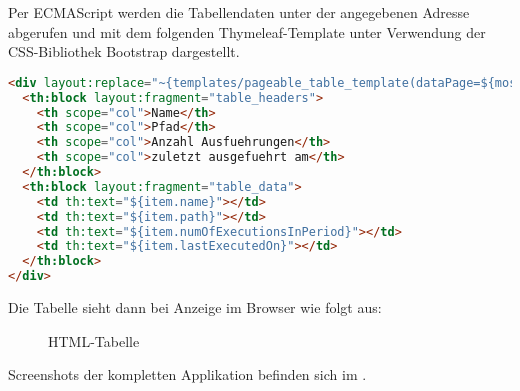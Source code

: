 Per ECMAScript werden die Tabellendaten unter der angegebenen Adresse abgerufen und \ua mit dem folgenden Thymeleaf-Template unter Verwendung der CSS-Bibliothek Bootstrap dargestellt.
\begin{lstlisting}[language=HTML,caption={Tabellen-Fragment}]
<div layout:replace="~{templates/pageable_table_template(dataPage=${mostUsedReports})}">
  <th:block layout:fragment="table_headers">
    <th scope="col">Name</th>
    <th scope="col">Pfad</th>
    <th scope="col">Anzahl Ausfuehrungen</th>
    <th scope="col">zuletzt ausgefuehrt am</th>
  </th:block>
  <th:block layout:fragment="table_data">
    <td th:text="${item.name}"></td>
    <td th:text="${item.path}"></td>
    <td th:text="${item.numOfExecutionsInPeriod}"></td>
    <td th:text="${item.lastExecutedOn}"></td>
  </th:block>
</div>
\end{lstlisting}
Die Tabelle sieht dann bei Anzeige im Browser wie folgt aus:
\begin{figure}[htb]
	\centering
	\caption{HTML-Tabelle}
	\label{fig:Tabelle}
\end{figure}
Screenshots der kompletten Applikation befinden sich im .


